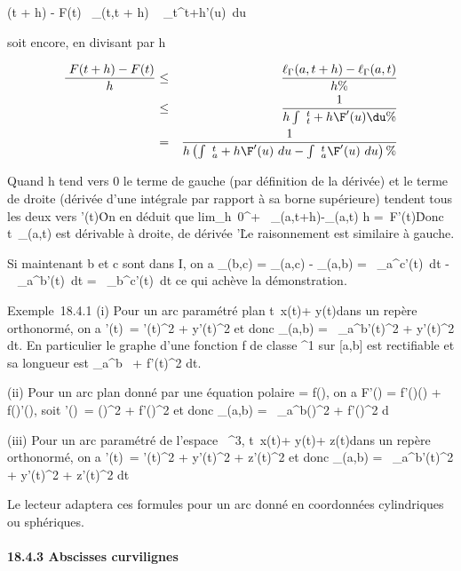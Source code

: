 \documentclass[]{article}
\begin{document}
\F(t + h) - F(t)\ \leq
\ell_\Gamma(t,t + h) \leq\int ~
_t^t+h\F'(u)\
du

soit encore, en divisant par h

\begin{align*} \ F(t + h)
- F(t) \over h & \leq&
\ell_\Gamma(a,t + h) - \ell_\Gamma(a,t) \over h \%&
\\ & \leq& 1 \over h
\int ~
_t^t+h\F'(u)\du
\%& \\ & =& 1 \over
h \left (\int ~
_a^t+h\F'(u)\
du -\int ~
_a^t\F'(u)\
du\right )\%& \\
\end{align*}

Quand h tend vers 0 le terme de gauche (par définition de la dérivée) et
le terme de droite (dérivée d'une intégrale par rapport à sa borne
supérieure) tendent tous les deux vers
\F'(t)\. On en déduit
que lim_h\rightarrow~0^+~
\ell_\Gamma(a,t+h)-\ell_\Gamma(a,t) \over h
='(t)\. Donc
t\mapsto~\ell_\Gamma(a,t) est dérivable à droite,
de dérivée \F'\. Le
raisonnement est similaire à gauche.

Si maintenant b et c sont dans I, on a \ell_\Gamma(b,c) =
\ell_\Gamma(a,c) - \ell_\Gamma(a,b) =\int ~
_a^c\F'(t)\
dt -\int ~
_a^b\F'(t)\
dt =\int ~
_b^c\F'(t)\
dt ce qui achève la démonstration.

Exemple~18.4.1 (i) Pour un arc paramétré plan
t\mapsto~x(t)\vec\imath +
y(t)\vecȷ dans un repère orthonormé, on a
\F'(t)\ =
\sqrtx'(t)^2  + y'(t)^2 et donc
\ell_\Gamma(a,b) =\int ~
_a^b\sqrtx'(t)^2  +
y'(t)^2 dt. En particulier le graphe d'une fonction f de
classe \mathcal{C}^1 sur [a,b] est rectifiable et sa longueur est
\int  _a^b~
+ f'(t)^2 dt.

(ii) Pour un arc plan donné par une équation polaire \rho = f(\theta), on a
F'(\theta) = f'(\theta)\vecu(\theta) +
f(\theta)\vecu'(\theta), soit
\F'(\theta)\ =
\sqrtf(\theta)^2  + f'(\theta)^2 et donc
\ell_\Gamma(a,b) =\int ~
_a^b\sqrtf(\theta)^2  +
f'(\theta)^2 d\theta

(iii) Pour un arc paramétré de l'espace ~^3,
t\mapsto~x(t)\vec\imath +
y(t)\vecȷ + z(t)\veck dans un
repère orthonormé, on a
\F'(t)\ =
\sqrtx'(t)^2  + y'(t)^2  +
z'(t)^2 et donc \ell_\Gamma(a,b)
=\int ~
_a^b\sqrtx'(t)^2  +
y'(t)^2  + z'(t)^2 dt

Le lecteur adaptera ces formules pour un arc donné en coordonnées
cylindriques ou sphériques.

\paragraph{18.4.3 Abscisses curvilignes}
\end{document}
